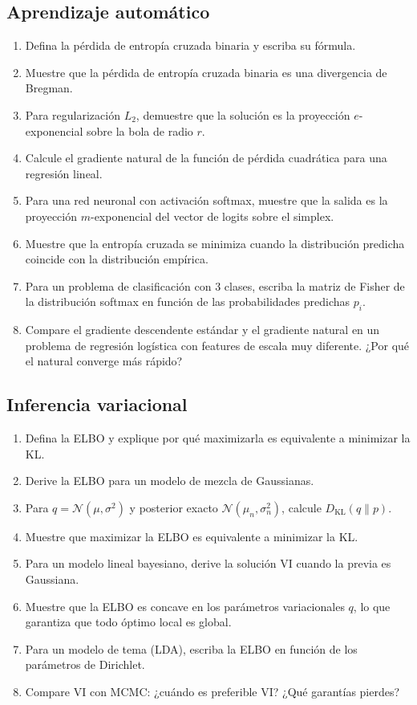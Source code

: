 \subsection*{Aprendizaje automático}
\begin{enumerate}[resume]
	\item[$\star$] Defina la pérdida de entropía cruzada binaria y escriba su fórmula.
	\item[$\star\star\star$] Muestre que la pérdida de entropía cruzada binaria es una divergencia de Bregman.
	\item[$\star\star\star$] Para regularización $L_2$, demuestre que la solución es la proyección $e$-exponencial sobre la bola de radio $r$.
	\item[$\star\star$] Calcule el gradiente natural de la función de pérdida cuadrática para una regresión lineal.
	\item[$\star\star\star$] Para una red neuronal con activación softmax, muestre que la salida es la proyección $m$-exponencial del vector de logits sobre el simplex.
	\item[$\star\star\star$] Muestre que la entropía cruzada se minimiza cuando la distribución predicha coincide con la distribución empírica.
	\item[$\star\star$] Para un problema de clasificación con 3 clases, escriba la matriz de Fisher de la distribución softmax en función de las probabilidades predichas $p_i$.
	\item[$\star\star\star$] Compare el gradiente descendente estándar y el gradiente natural en un problema de regresión logística con features de escala muy diferente.  ¿Por qué el natural converge más rápido?
\end{enumerate}

\subsection*{Inferencia variacional}
\begin{enumerate}[resume]
	\item[$\star$] Defina la ELBO y explique por qué maximizarla es equivalente a minimizar la KL.
	\item[$\star\star\star$] Derive la ELBO para un modelo de mezcla de Gaussianas.
	\item[$\star\star$] Para $q = \mathcal{N}(\mu, \sigma^2)$ y posterior exacto $\mathcal{N}(\mu_n, \sigma_n^2)$, calcule $D_{\mathrm{KL}}(q \| p)$.
	\item[$\star\star\star$] Muestre que maximizar la ELBO es equivalente a minimizar la KL.
	\item[$\star\star\star$] Para un modelo lineal bayesiano, derive la solución VI cuando la previa es Gaussiana.
	\item[$\star\star\star$] Muestre que la ELBO es concave en los parámetros variacionales $q$, lo que garantiza que todo óptimo local es global.
	\item[$\star\star$] Para un modelo de tema (LDA), escriba la ELBO en función de los parámetros de Dirichlet.
	\item[$\star\star\star$] Compare VI con MCMC: ¿cuándo es preferible VI?  ¿Qué garantías pierdes?
\end{enumerate}


